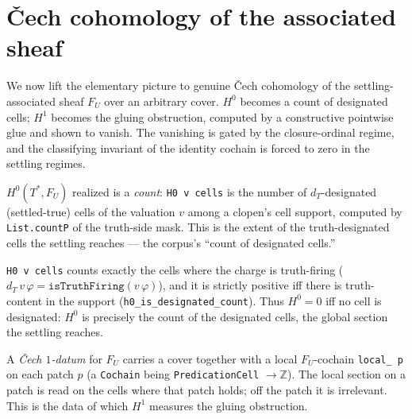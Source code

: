 \section{\v{C}ech cohomology of the associated sheaf}

We now lift the elementary picture to genuine \v{C}ech cohomology of the settling-associated sheaf $F_U$ over an arbitrary cover. $H^0$ becomes a count of designated cells; $H^1$ becomes the gluing obstruction, computed by a constructive pointwise glue and shown to vanish. The vanishing is gated by the closure-ordinal regime, and the classifying invariant of the identity cochain is forced to zero in the settling regimes.

\begin{definition}\label{def:h0-count}\leanok{}
$H^0(T^*, F_U)$ realized is a \emph{count}: \texttt{H0 v cells} is the number of $d_T$-designated (settled-true) cells of the valuation $v$ among a clopen's cell support, computed by \texttt{List.countP} of the truth-side mask. This is the extent of the truth-designated cells the settling reaches --- the corpus's ``count of designated cells.''
\end{definition}

\begin{theorem}\label{thm:settling-cohomology-h1-vanishes}\leanok{}
\texttt{H0 v cells} counts exactly the cells where the charge is truth-firing ($d_T\,v\,\varphi = \texttt{isTruthFiring}(v\,\varphi)$), and it is strictly positive iff there is truth-content in the support (\texttt{h0\_is\_designated\_count}). Thus $H^0 = 0$ iff no cell is designated: $H^0$ is precisely the count of the designated cells, the global section the settling reaches.
\end{theorem}

\begin{definition}\label{def:cech1}\leanok{}
A \emph{\v{C}ech $1$-datum} for $F_U$ carries a cover together with a local $F_U$-cochain \texttt{local\_ p} on each patch $p$ (a \texttt{Cochain} being \texttt{PredicationCell} $\to \mathbb{Z}$). The local section on a patch is read on the cells where that patch holds; off the patch it is irrelevant. This is the data of which $H^1$ measures the gluing obstruction.
\end{definition}

